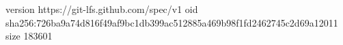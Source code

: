 version https://git-lfs.github.com/spec/v1
oid sha256:726ba9a74d816f49af9bc1db399ac512885a469b98f1fd2462745c2d69a12011
size 183601
